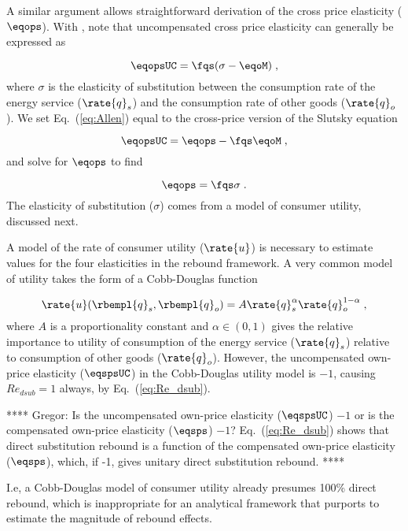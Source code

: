 A similar argument allows straightforward derivation 
of the cross price elasticity ($\eqops$).
With \citet{Hicks1934}, 
note that uncompensated cross price elasticity can generally be expressed as

\begin{equation} \label{eq:Allen}
  \eqopsUC = \fqs (\sigma - \eqoM) \; ,
\end{equation}
%
where $\sigma$ is the elasticity of substitution 
between the consumption rate of the energy service ($\rate{q}_s$) and
the consumption rate of other goods ($\rate{q}_o$). 
We set Eq.~(\ref{eq:Allen}) equal to 
the cross-price version of the Slutsky equation

\begin{equation} \label{eq:slutsky_cross}
  \eqopsUC = \eqops - \fqs \eqoM \; ,
\end{equation}
%
and solve for $\eqops$ to find

\begin{equation} \label{eq:eqops_general}
  \eqops = \fqs \sigma \; .
\end{equation}
%
The elasticity of substitution ($\sigma$)
comes from a model of consumer utility, discussed next.

A model of the rate of consumer utility ($\rate{u}$)
is necessary to estimate values for the four elasticities
in the rebound framework.
A very common model of utility takes the form of a Cobb-Douglas function

\begin{equation} \label{eq:CD_utility}
  \rate{u}(\rbempl{q}_s,\rbempl{q}_o) = A \rate{q}_s^\alpha \rate{q}_o^{1 - \alpha} \; ,
\end{equation}
%
where $A$ is a proportionality constant and 
$\alpha \in (0,1)$ gives the relative importance to utility 
of consumption of the energy service ($\rate{q}_s$)
relative to consumption of other goods ($\rate{q}_o$). 
However, the uncompensated own-price elasticity ($\eqspsUC$) 
in the Cobb-Douglas utility model is $-1$, 
causing $Re_{dsub} = 1$ always,
by Eq.~(\ref{eq:Re_dsub}).

**** Gregor: Is the uncompensated own-price elasticity ($\eqspsUC$) $-1$ 
or is the compensated own-price elasticity ($\eqsps$) $-1$?
Eq.~(\ref{eq:Re_dsub}) shows that direct substitution rebound is a function of the 
compensated own-price elasticity ($\eqsps$), which, if -1, gives unitary direct substitution rebound.
****

I.e, a Cobb-Douglas model of consumer utility already presumes 100\% direct rebound,
which is inappropriate for an analytical framework that purports to 
estimate the magnitude of rebound effects.

